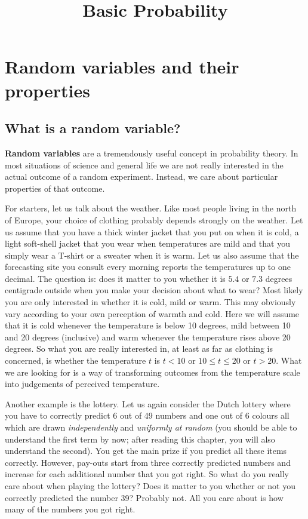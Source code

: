 \documentclass[a4paper,11pt,leqno]{report}
\title{Basic Probability}
\date{}
\begin{document}
\chapter{Random variables and their properties}

\section{What is a random variable?}
\textbf{Random variables} are a tremendously useful concept in probability theory. In most situations of
science and general life we are not really interested in the actual outcome of a random experiment. Instead,
we care about particular properties of that outcome.

For starters, let us talk about the weather. 
Like most people living in the north of Europe, your choice of clothing
probably depends strongly on the weather. Let us assume that you have a thick winter jacket that you
put on when it is cold, a light soft-shell jacket that you wear when temperatures are mild and that you
simply wear a T-shirt or a sweater when it is warm. Let us also assume that the forecasting site you
consult every morning reports the temperatures up to one decimal. The question is: does it matter to you
whether it is $ 5.4 $ or $ 7.3 $ degrees centigrade outside when you make your decision about what to wear?
Most likely you are only interested in whether it is cold, mild or warm. This may obviously vary according
to your own perception of warmth and cold. Here we will assume that it is cold whenever the temperature
is below 10 degrees, mild between 10 and 20 degrees (inclusive) and warm whenever the temperature rises
above 20 degrees. So what you are really interested in, at least as far as clothing is concerned, is 
whether the temperature $ t $ is $ t < 10 $ or $ 10 \leq t \leq 20 $ or $ t > 20 $. What we are looking for
is a way of transforming outcomes from the temperature scale into judgements of perceived temperature.

Another example is the lottery. Let us again consider the Dutch lottery where you have to correctly 
predict 6 out of 49 numbers and one out of 6 colours all which are drawn \textit{independently} 
and \textit{uniformly at random} (you should be able to understand the first term by now; after reading
this chapter, you will also understand the second). You get the main prize if you predict all these items
correctly. However, pay-outs start from three correctly predicted numbers and increase for each additional
number that you got right. So what do you really care about when playing the lottery? Does it matter to
you whether or not you correctly predicted the number 39? Probably not. All you care about is how many of
the numbers you got right.
\end{document}
